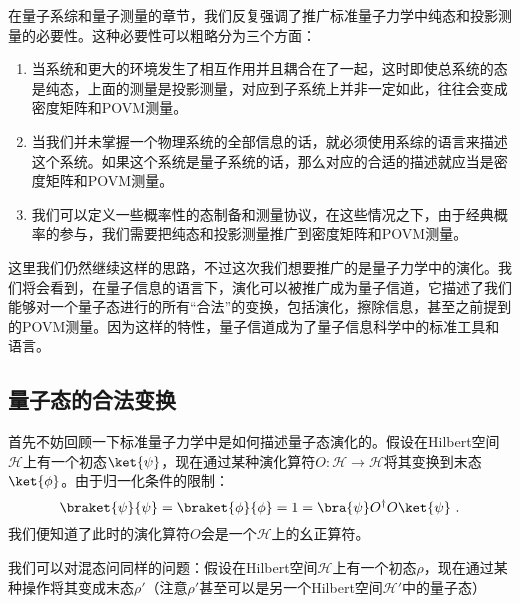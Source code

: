 

在量子系综和量子测量的章节，我们反复强调了推广标准量子力学中纯态和投影测量的必要性。这种必要性可以粗略分为三个方面：
\begin{enumerate}
\item 当系统和更大的环境发生了相互作用并且耦合在了一起，这时即使总系统的态是纯态，上面的测量是投影测量，对应到子系统上并非一定如此，往往会变成密度矩阵和POVM测量。
\item 当我们并未掌握一个物理系统的全部信息的话，就必须使用系综的语言来描述这个系统。如果这个系统是量子系统的话，那么对应的合适的描述就应当是密度矩阵和POVM测量。
\item 我们可以定义一些概率性的态制备和测量协议，在这些情况之下，由于经典概率的参与，我们需要把纯态和投影测量推广到密度矩阵和POVM测量。
\end{enumerate}

这里我们仍然继续这样的思路，不过这次我们想要推广的是量子力学中的演化。我们将会看到，在量子信息的语言下，演化可以被推广成为量子信道，它描述了我们能够对一个量子态进行的所有“合法”的变换，包括演化，擦除信息，甚至之前提到的POVM测量。因为这样的特性，量子信道成为了量子信息科学中的标准工具和语言。

\subsection{量子态的合法变换}

首先不妨回顾一下标准量子力学中是如何描述量子态演化的。假设在Hilbert空间$\mathcal{H}$上有一个初态$\ket{\psi}$，现在通过某种演化算符$O:\mathcal{H}\to\mathcal{H}$将其变换到末态$\ket{\phi}$。由于归一化条件的限制：
\begin{equation}
\braket{\psi}{\psi}=\braket{\phi}{\phi}=1=\bra{\psi}O^\dagger O\ket{\psi}~.
\end{equation}
我们便知道了此时的演化算符$O$会是一个$\mathcal{H}$上的幺正算符。

我们可以对混态问同样的问题：假设在Hilbert空间$\mathcal{H}$上有一个初态$\rho$，现在通过某种操作将其变成末态$\rho'$（注意$\rho'$甚至可以是另一个Hilbert空间$\mathcal{H}'$中的量子态）
